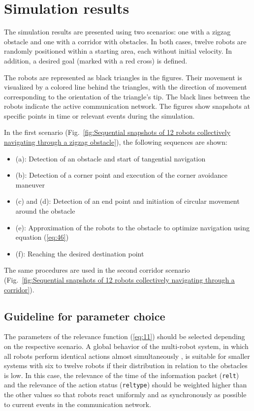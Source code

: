 \documentclass[conference]{IEEEtran}
\begin{document}
\section{Simulation results}
The simulation results are presented using two scenarios: 
one with a zigzag obstacle and one with a corridor with obstacles. 
In both cases, twelve robots are randomly 
positioned within a starting area, each without initial velocity. 
In addition, a desired goal (marked with a red cross) is defined.

The robots are represented as black triangles in the figures. 
Their movement is visualized by a colored line behind the triangles, 
with the direction of movement corresponding to the orientation of the triangle's tip. The black 
lines between the robots indicate the active communication network. 
The figures show snapshots at specific points in time or 
relevant events during the simulation.

In the first scenario (Fig.~\ref{fig:Sequential snapshots of 12 robots collectively navigating through a zigzag obstacle}), the following sequences are shown:
\begin{itemize}
\item (a): Detection of an obstacle and start of tangential navigation
\item (b): Detection of a corner point and execution of the corner avoidance maneuver
\item (c) and (d): Detection of an end point and initiation of circular movement around the obstacle
\item (e): Approximation of the robots to the obstacle to optimize navigation using equation (\eqref{eq:46})
\item (f): Reaching the desired destination point
\end{itemize}

The same procedures are used in the second corridor scenario (Fig.~\ref{fig:Sequential snapshots of 12 robots collectively navigating through a corridor}).

\subsection*{Guideline for parameter choice}
The parameters of the relevance function (\eqref{eq:11}) should be selected depending on the 
respective scenario. A global behavior of the 
multi-robot system, in which all robots perform identical actions almost simultaneously ,
 is suitable for smaller systems with six to twelve 
robots if their distribution in relation to the obstacles 
is low. In this case, the relevance of the time of the information packet 
(\texttt{relt}) and the relevance of the action status (\texttt{reltype}) should be weighted higher 
than the other values so that robots react uniformly and as synchronously as possible
to current events in the communication network.
\end{document}
